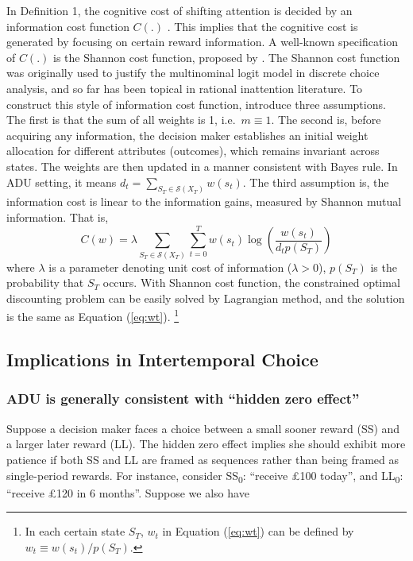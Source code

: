\documentclass[
  12pt,
]{article}
\begin{document}
In Definition 1, the cognitive cost of shifting attention is decided by
an information cost function \(C(.)\) . This implies that the cognitive
cost is generated by focusing on certain reward information. A
well-known specification of \(C(.)\) is the Shannon cost function,
proposed by \citet{matejka_rational_2015}. The Shannon cost function was
originally used to justify the multinominal logit model in discrete
choice analysis, and so far has been topical in rational inattention
literature. To construct this style of information cost function,
\citet{matejka_rational_2015} introduce three assumptions. The first is
that the sum of all weights is 1, i.e.~\(m\equiv1\). The second is,
before acquiring any information, the decision maker establishes an
initial weight allocation for different attributes (outcomes), which
remains invariant across states. The weights are then updated in a
manner consistent with Bayes rule. In ADU setting, it means
\(d_t=\sum_{S_T\in \mathcal{S}(X_T)} w(s_t)\). The third assumption is,
the information cost is linear to the information gains, measured by
Shannon mutual information. That
is,\[ C(w)= \lambda \sum_{S_T\in \mathcal{S}(X_T)}\sum_{t=0}^T w(s_t) \log\left(\frac{w(s_t)}{d_t p(S_T)}\right) \]where
\(\lambda\) is a parameter denoting unit cost of information
(\(\lambda>0\)), \(p(S_T)\) is the probability that \(S_T\) occurs. With
Shannon cost function, the constrained optimal discounting problem can
be easily solved by Lagrangian method, and the solution is the same as
Equation (\ref{eq:wt}). \footnote{In each certain state \(S_T\), \(w_t\)
  in Equation (\ref{eq:wt}) can be defined by
  \(w_t\equiv w(s_t)/p(S_T)\).}

\hypertarget{implications-in-intertemporal-choice}{%
\subsection{Implications in Intertemporal
Choice}\label{implications-in-intertemporal-choice}}

\hypertarget{adu-is-generally-consistent-with-hidden-zero-effect}{%
\subsubsection{ADU is generally consistent with ``hidden zero
effect''}\label{adu-is-generally-consistent-with-hidden-zero-effect}}

Suppose a decision maker faces a choice between a small sooner reward
(SS) and a larger later reward (LL). The hidden zero effect
\citep{magen_hidden-zero_2008} implies she should exhibit more patience
if both SS and LL are framed as sequences rather than being framed as
single-period rewards. For instance, consider SS\textsubscript{0}:
``receive £100 today'', and LL\textsubscript{0}: ``receive £120 in 6
months''. Suppose we also have
\end{document}
